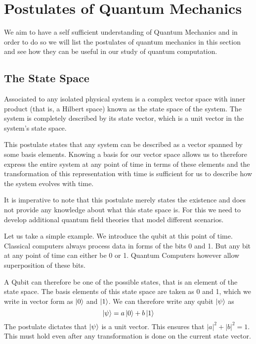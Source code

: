 \section{Postulates of Quantum Mechanics}

We aim to have a self sufficient understanding of Quantum Mechanics and in order to do so we will list the postulates of quantum mechanics in this section and see how they can be useful in our study of quantum computation.

\subsection{The State Space}
\begin{postulate}
Associated to any isolated physical system is a complex vector space
with inner product (that is, a Hilbert space) known as the state space of the system. The system is completely described by its state vector, which is a unit vector in the system’s state space.
\end{postulate}

This postulate states that any system can be described as a vector spanned by some basis elements. Knowing a basis for our vector space allows us to therefore express the entire system at any point of time in terms of these elements and the transformation of this representation with time is sufficient  for us to describe how the system evolves with time.

It is imperative to note that this postulate merely states the existence and does not provide any knowledge about what this state space is. For this we need to develop additional quantum field theories that model different scenarios. 

Let us take a simple example. We introduce the qubit at this point of time. Classical computers always process data in forms of the bits 0 and 1. But any bit at any point of time can either be 0 or 1. Quantum Computers however allow superposition of these bits.

A Qubit can therefore be one of the possible states, that is an element of the state space. The basis elements of this state space are taken as 0 and 1, which we write in vector form as $\ket{0}$ and $\ket{1}$. 
We can therefore write any qubit $\ket{\psi}$ as 
$$\ket{\psi} = a\ket{0} + b\ket{1}$$
The postulate dictates that $\ket{\psi}$ is a unit vector. This ensures that $|a|^2 + |b|^2 = 1$. This must hold even after any transformation is done on the current state vector.

